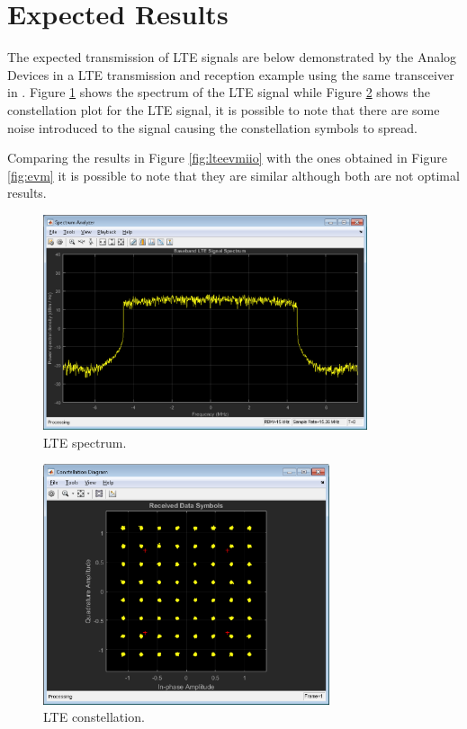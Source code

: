 \section{Expected Results}
\label{result:optimum}

The expected transmission of LTE signals are below demonstrated by the Analog
Devices in a LTE transmission and reception example using the same transceiver
in \cite{web:lteexamplewiki}. Figure \ref{fig:ltespectrumiio} shows the spectrum
of the LTE signal while Figure \ref{fig:lteconstellationiio}  shows the
constellation plot for the LTE signal, it is possible to note that there are
some noise introduced to the signal causing the constellation symbols to spread.

Comparing the results in Figure \ref{fig:lteevmiio} with the ones obtained in
Figure \ref{fig:evm} it is possible to note that they are similar although both
are not optimal results.

\begin{figure}[htbp]
    \centering
    \includegraphics[width=0.85\textwidth]{./figures/hsa}
    \caption{ LTE spectrum.
    \label{fig:ltespectrumiio}}
\end{figure}

\begin{figure}[htbp]
    \centering
    \includegraphics[width=0.75\textwidth]{./figures/hcd}
    \caption{ LTE constellation.
    \label{fig:lteconstellationiio}}
\end{figure}

